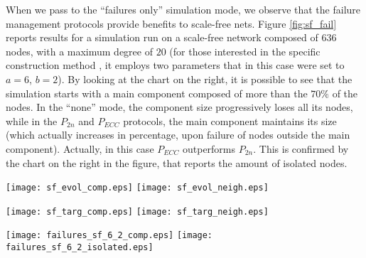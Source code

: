 \documentclass[10pt, conference, compsocconf]{IEEEtran}
\begin{document}
When we pass to the ``failures only'' simulation mode, we observe that the failure management protocols provide benefits to scale-free nets. Figure \ref{fig:sf_fail} reports results for a simulation run on a scale-free network composed of $636$ nodes, with a maximum degree of $20$ (for those interested in the specific construction method \cite{Aiello00arandom}, it employs two parameters that in this case were set to $a=6$, $b=2$). 
By looking at the chart on the right, it is possible to see that the simulation starts with a main component composed of more than the $70\%$ of the nodes. In the ``none'' mode, the component size progressively loses all its nodes, while in the $P_{2n}$ and $P_{ECC}$ protocols, the main component maintains its size (which actually increases in percentage, upon failure of nodes outside the main component). Actually, in this case $P_{ECC}$ outperforms $P_{2n}$. This is confirmed by the chart on the right in the figure, that reports the amount of isolated nodes.

\begin{figure*}[t]
   \centering
   \texttt{[image: sf\_evol\_comp.eps]}
   \texttt{[image: sf\_evol\_neigh.eps]}
   \caption{Scale-free networks: average size of the main components, average amount of $1$-neighbors (referred as ``n1'') and $2$-neighbors (referred as ``n2''), during the evolution of the network.}
   \label{fig:sf_evol}
\end{figure*}

\begin{figure*}[t]
   \centering
   \texttt{[image: sf\_targ\_comp.eps]}
   \texttt{[image: sf\_targ\_neigh.eps]}
   \caption{Scale-free networks: average size of the main components, average amount of $1$-neighbors (referred as ``n1'') and $2$-neighbors (referred as ``n2''), under a targeted attack.}
   \label{fig:sf_targ}
\end{figure*}

\begin{figure*}[t]
   \centering
   \texttt{[image: failures\_sf\_6\_2\_comp.eps]}
      \hspace{1.5cm}
   \texttt{[image: failures\_sf\_6\_2\_isolated.eps]}
   \caption{Scale-free networks -- progressive node failures: Amount of nodes in the main component, isolated nodes.}
   \label{fig:sf_fail}
\end{figure*}
\end{document}
